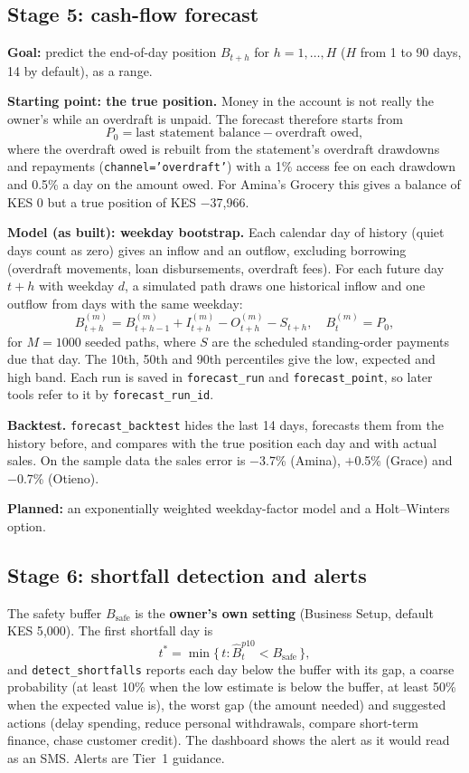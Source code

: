\documentclass[10pt,a4paper]{article}
\newcommand{\code}[1]{\texttt{\small #1}}
\begin{document}
\subsection{Stage 5: cash-flow forecast}
\label{sec:forecast}
\textbf{Goal:} predict the end-of-day position $B_{t+h}$ for $h=1,\dots,H$ ($H$ from 1 to 90 days, 14 by default), as a range.

\textbf{Starting point: the true position.} Money in the account is not really the owner's while an overdraft is unpaid. The forecast therefore starts from
\[
P_0 = \text{last statement balance} - \text{overdraft owed},
\]
where the overdraft owed is rebuilt from the statement's overdraft drawdowns and repayments (\code{channel='overdraft'}) with a 1\% access fee on each drawdown and 0.5\% a day on the amount owed. For Amina's Grocery this gives a balance of KES 0 but a true position of KES $-$37{,}966.

\textbf{Model (as built): weekday bootstrap.} Each calendar day of history (quiet days count as zero) gives an inflow and an outflow, excluding borrowing (overdraft movements, loan disbursements, overdraft fees). For each future day $t+h$ with weekday $d$, a simulated path draws one historical inflow and one outflow from days with the same weekday:
\[
B^{(m)}_{t+h} = B^{(m)}_{t+h-1} + I^{(m)}_{t+h} - O^{(m)}_{t+h} - S_{t+h}, \quad B^{(m)}_t=P_0,
\]
for $M=1000$ seeded paths, where $S$ are the scheduled standing-order payments due that day. The 10th, 50th and 90th percentiles give the low, expected and high band. Each run is saved in \code{forecast\_run} and \code{forecast\_point}, so later tools refer to it by \code{forecast\_run\_id}.

\textbf{Backtest.} \code{forecast\_backtest} hides the last 14 days, forecasts them from the history before, and compares with the true position each day and with actual sales. On the sample data the sales error is $-$3.7\% (Amina), $+$0.5\% (Grace) and $-$0.7\% (Otieno).

\textbf{Planned:} an exponentially weighted weekday-factor model and a Holt--Winters option.

\subsection{Stage 6: shortfall detection and alerts}
The safety buffer $B_{\text{safe}}$ is the \textbf{owner's own setting} (Business Setup, default KES 5{,}000). The first shortfall day is
\[
t^{*}=\min\{\,t:\hat B^{p10}_{t}<B_{\text{safe}}\,\},
\]
and \code{detect\_shortfalls} reports each day below the buffer with its gap, a coarse probability (at least 10\% when the low estimate is below the buffer, at least 50\% when the expected value is), the worst gap (the amount needed) and suggested actions (delay spending, reduce personal withdrawals, compare short-term finance, chase customer credit). The dashboard shows the alert as it would read as an SMS. Alerts are Tier~1 guidance.
\end{document}
